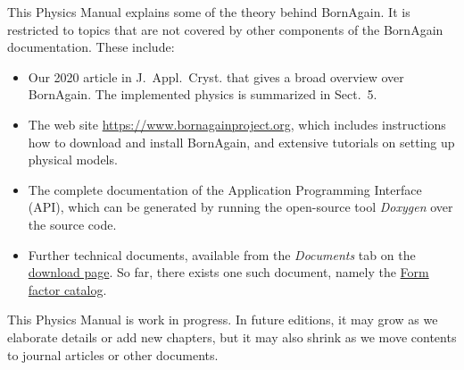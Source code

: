 This Physics Manual explains some of the theory behind BornAgain.
It is restricted to topics that are not covered by other components
of the BornAgain documentation.
These include:
\begin{itemize}
\item Our 2020 article in J.~Appl.\ Cryst. \cite{PoHB20}
that gives a broad overview over BornAgain.
The implemented physics is summarized in Sect.~5.
\item {}
The web site \url{https://www.bornagainproject.org},
which includes instructions how to download and install BornAgain,
and extensive tutorials on setting up physical models.
\item {}
The complete documentation of the Application Programming Interface (API),
which can be generated by running 
the open-source tool \emph{Doxygen} over the source code.
\item Further technical documents,
available from the \emph{Documents} tab on the
\href{https://www.bornagainproject.org/download#Documents}{download page}.
So far, there exists one such document, namely the
\href{http://apps.jcns.fz-juelich.de/src/BornAgain/FFCatalog.pdf}{Form factor catalog}.
\end{itemize}
This Physics Manual is work in progress.
In future editions, it may grow as we elaborate details or add new chapters,
but it may also shrink as we move contents to journal articles or other documents.


